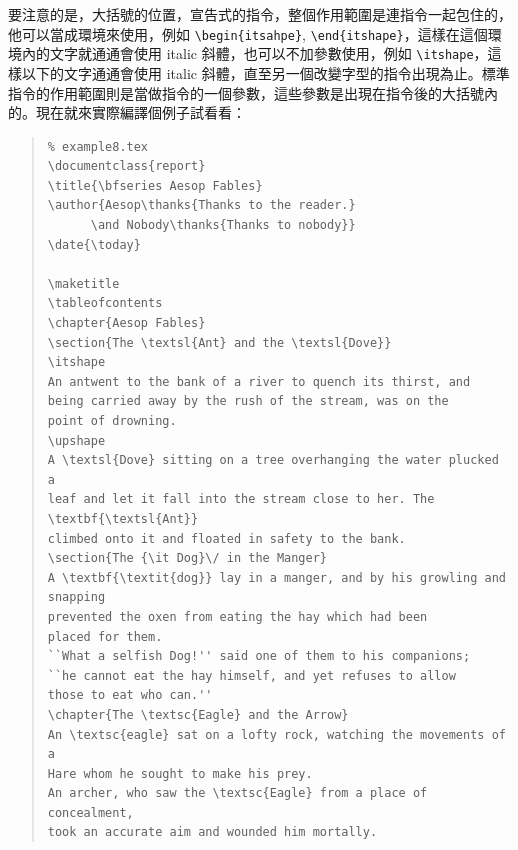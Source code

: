 要注意的是，大括號的位置，宣告式的指令，整個作用範圍是連指令一起包住的，他可以當成環境來使用，例如 \verb|\begin{itsahpe}|, \verb|\end{itshape}|，這樣在這個環境內的文字就通通會使用 italic 斜體，也可以不加參數使用，例如 \verb|\itshape|，這樣以下的文字通通會使用 italic 斜體，直至另一個改變字型的指令出現為止。標準指令的作用範圍則是當做指令的一個參數，這些參數是出現在指令後的大括號內的。現在就來實際編譯個例子試看看：

\begin{quote}
   \begin{verbatim}
% example8.tex
\documentclass{report}
\title{\bfseries Aesop Fables}
\author{Aesop\thanks{Thanks to the reader.}
      \and Nobody\thanks{Thanks to nobody}}
\date{\today}

\maketitle
\tableofcontents
\chapter{Aesop Fables}
\section{The \textsl{Ant} and the \textsl{Dove}}
\itshape
An antwent to the bank of a river to quench its thirst, and
being carried away by the rush of the stream, was on the
point of drowning.
\upshape
A \textsl{Dove} sitting on a tree overhanging the water plucked a
leaf and let it fall into the stream close to her. The \textbf{\textsl{Ant}}
climbed onto it and floated in safety to the bank.
\section{The {\it Dog}\/ in the Manger}
A \textbf{\textit{dog}} lay in a manger, and by his growling and snapping
prevented the oxen from eating the hay which had been
placed for them.
``What a selfish Dog!'' said one of them to his companions;
``he cannot eat the hay himself, and yet refuses to allow
those to eat who can.''
\chapter{The \textsc{Eagle} and the Arrow}
An \textsc{eagle} sat on a lofty rock, watching the movements of a
Hare whom he sought to make his prey.
An archer, who saw the \textsc{Eagle} from a place of concealment,
took an accurate aim and wounded him mortally.

\end{verbatim}
\end{quote}

